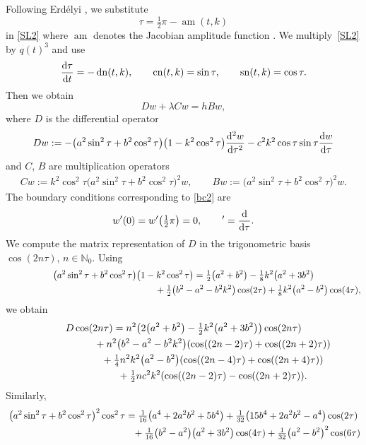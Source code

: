 \documentclass[10pt,a4paper]{amsart}
\newcommand{\N}{\mathbb{N}}
\DeclareMathOperator{\sn}{sn}
\DeclareMathOperator{\cn}{cn}
\DeclareMathOperator{\dn}{dn}
\DeclareMathOperator{\am}{am}
\numberwithin{equation}{section}
\begin{document}
Following Erd\'elyi \cite[formula~(4), p.~56]{EMO3}, we substitute
\[ \tau=\tfrac12\pi-\am(t,k) \]
in \eqref{SL2} where $\am$ denotes the Jacobian amplitude function \cite[Section~22.16\,(i)]{dlmf}.
We multiply~\eqref{SL2} by $q(t)^3$ and use
\[ \frac{{\rm d}\tau}{{\rm d}t}=-\dn(t,k),\qquad \cn(t,k)=\sin \tau, \qquad\sn(t,k)=\cos\tau.\]
Then we obtain
\begin{equation}\label{ode7}
D w +\lambda C w= h B w,
\end{equation}
where $D$ is the differential operator
\begin{equation*}%
 Dw:=-\bigl(a^2\sin^2\tau+b^2\cos^2\tau\bigr)\bigl(1-k^2\cos^2\tau\bigr) \frac{{\rm d}^2w}{{\rm d}\tau^2}-c^2k^2\cos\tau\sin\tau \frac{{\rm d}w}{{\rm d}\tau}
\end{equation*}
and $C$, $B$ are multiplication operators
\begin{gather*}
 Cw := k^2\cos^2\tau \bigl(a^2\sin^2\tau+b^2\cos^2\tau\bigr)^2 w,\qquad
 Bw := \bigl(a^2\sin^2\tau+b^2\cos^2\tau\bigr)^2 w.
 \end{gather*}
The boundary conditions corresponding to \eqref{bc2} are
\begin{equation*}%
 w'(0)=w'\bigl(\tfrac12\pi\bigr)=0,\qquad '=\frac{{\rm d}}{{\rm d}\tau} .
\end{equation*}
We compute the matrix representation of $D$ in the trigonometric basis $\cos(2n\tau)$, $n\in\N_0$.
Using
\begin{gather*}
\bigl(a^2\sin^2\tau+b^2\cos^2\tau\bigr)\bigl(1-k^2\cos^2\tau\bigr) =
\tfrac12\bigl(a^2+b^2\bigr)-\tfrac18k^2\bigl(a^2+3b^2\bigr) \\ \hphantom{\bigl(a^2\sin^2\tau+b^2\cos^2\tau\bigr)\bigl(1-k^2\cos^2\tau\bigr) =}{}\!
+\tfrac12\bigl(b^2-a^2-b^2k^2\bigr)\cos(2\tau)+\tfrac18k^2\bigl(a^2-b^2\bigr)\cos(4\tau),
\end{gather*}
we obtain
\begin{gather}
 D\cos(2n\tau)= n^2\bigl(2\bigl(a^2+b^2\bigr)-\tfrac12k^2\bigl(a^2+3b^2\bigr)\bigr)\cos(2n\tau) \nonumber\\ \hphantom{D\cos(2n\tau)=}{}
 +n^2\bigl(b^2-a^2-b^2k^2\bigr)(\cos((2n-2)\tau)+\cos((2n+2)\tau))\nonumber\\ \hphantom{D\cos(2n\tau)=}{}
 + \tfrac14n^2k^2\bigl(a^2-b^2\bigr)(\cos((2n-4)\tau)+\cos((2n+4)\tau))\nonumber \\ \hphantom{D\cos(2n\tau)=}{}
 +\tfrac12 nc^2k^2(\cos((2n-2)\tau)-\cos((2n+2)\tau)).\label{matrixD}
\end{gather}
Similarly,
\begin{gather*}
\bigl(a^2\sin^2\tau+b^2\cos^2\tau\bigr)^2\cos^2\tau =\tfrac1{16}\bigl(a^4+2a^2b^2+5b^4\bigr)+\tfrac1{32}\bigl(15b^4+2a^2b^2-a^4\bigr)\cos(2\tau)
\\ \hphantom{\bigl(a^2\sin^2\tau+b^2\cos^2\tau\bigr)^2\cos^2\tau =}{}
+\tfrac1{16}\bigl(b^2-a^2\bigr)\bigl(a^2+3b^2\bigr)\cos(4\tau) +\tfrac1{32}\bigl(a^2-b^2\bigr)^2\cos(6\tau)
\end{gather*}
\end{document}
